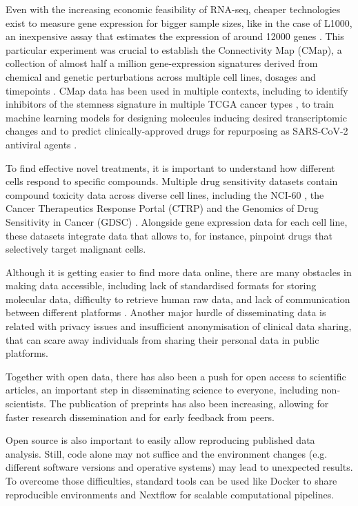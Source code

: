 Even with the increasing economic feasibility of RNA-seq, cheaper technologies exist to measure gene expression for bigger sample sizes, like in the case of L1000, an inexpensive assay that estimates the expression of around 12000 genes \cite{subramanian:2017ul}. This particular experiment was crucial to establish the Connectivity Map (CMap), a collection of almost half a million gene-expression signatures derived from chemical and genetic perturbations across multiple cell lines, dosages and timepoints \cite{subramanian:2017ul}. CMap data has been used in multiple contexts, including to identify inhibitors of the stemness signature in multiple TCGA cancer types \cite{malta:2018uj}, to train machine learning models for designing molecules inducing desired transcriptomic changes \cite{mendez-lucio:2020th} and to predict clinically-approved drugs for repurposing as SARS-CoV-2 antiviral agents \cite{le:2021uq}.

To find effective novel treatments, it is important to understand how different cells respond to specific compounds. Multiple drug sensitivity datasets contain compound toxicity data across diverse cell lines, including the NCI-60 \cite{shoemaker:2006wi}, the Cancer Therapeutics Response Portal (CTRP) \cite{seashore-ludlow:2015ws} and the Genomics of Drug Sensitivity in Cancer (GDSC) \cite{yang:2012vk}. Alongside gene expression data for each cell line, these datasets integrate data that allows to, for instance, pinpoint drugs that selectively target malignant cells. %

Although it is getting easier to find more data online, there are many obstacles in making data accessible, including lack of standardised formats for storing molecular data, difficulty to retrieve human raw data, and lack of communication between different platforms \cite{rockhold:2019ws}. Another major hurdle of disseminating data is related with privacy issues and insufficient anonymisation of clinical data sharing, that can scare away individuals from sharing their personal data in public platforms.

Together with open data, there has also been a push for open access to scientific articles, an important step in disseminating science to everyone, including non-scientists. The publication of preprints has also been increasing, allowing for faster research dissemination and for early feedback from peers.

Open source is also important to easily allow reproducing published data analysis. Still, code alone may not suffice and the environment changes (e.g. different software versions and operative systems) may lead to unexpected results. To overcome those difficulties, standard tools can be used like Docker to share reproducible environments and Nextflow for scalable computational pipelines.

